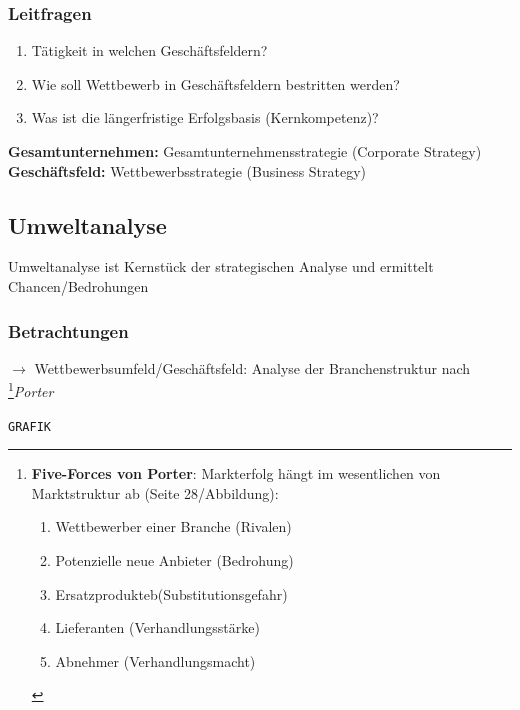 \documentclass[a4paper,11pt, twoside]{article}
\begin{document}
\subsubsection*{Leitfragen}
\begin{enumerate}
	\item Tätigkeit in welchen Geschäftsfeldern?
	\item Wie soll Wettbewerb in Geschäftsfeldern bestritten werden?
	\item Was ist die längerfristige Erfolgsbasis (Kernkompetenz)?
\end{enumerate}

\textbf{Gesamtunternehmen:} Gesamtunternehmensstrategie (Corporate Strategy)\\
\textbf{Geschäftsfeld:} Wettbewerbsstrategie (Business Strategy)

\subsection{Umweltanalyse}

Umweltanalyse ist Kernstück der strategischen Analyse und ermittelt Chancen/Bedrohungen

\subsubsection*{Betrachtungen}
$\rightarrow$ Wettbewerbsumfeld/Geschäftsfeld: Analyse der Branchenstruktur nach \footnote{
\textbf{Five-Forces von Porter}: Markterfolg hängt im wesentlichen von Marktstruktur ab (Seite 28/Abbildung):
\begin{enumerate}
	\item Wettbewerber einer Branche (Rivalen)
	\item Potenzielle neue Anbieter (Bedrohung)
	\item Ersatzprodukteb(Substitutionsgefahr)
	\item Lieferanten (Verhandlungsstärke)
	\item Abnehmer (Verhandlungsmacht)
\end{enumerate}
}{\textit{Porter}}

\texttt{GRAFIK}
\end{document}
